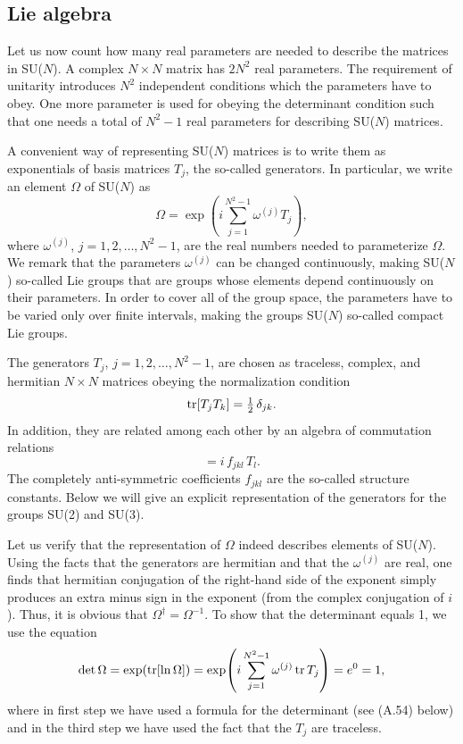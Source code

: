 \subsection{Lie algebra}

Let us now count how many real parameters are needed to describe the matrices
in SU($N$). A complex $N\times N$ matrix has $2N^2$ real parameters. The
requirement of unitarity introduces $N^2$ independent conditions which the
parameters have to obey. One more parameter is used for obeying the determinant
condition such that one needs a total of $N^2-1$ real parameters for describing
SU($N$) matrices.

A convenient way of representing SU($N$) matrices is to write them as
exponentials of basis matrices $T_j$, the so-called generators. In particular,
we write an element $\Omega$ of SU($N$) as
\begin{equation}
  \Omega = \exp\!\left(i\sum_{j=1}^{N^2-1}\omega^{(j)} T_j\right),
\end{equation}
where $\omega^{(j)}$, $j = 1, 2, \ldots, N^2-1$, are the real numbers needed to
parameterize $\Omega$. We remark that the parameters $\omega^{(j)}$ can be
changed continuously, making SU($N$) so-called Lie groups that are groups whose
elements depend continuously on their parameters. In order to cover all of the
group space, the parameters have to be varied only over finite intervals,
making the groups SU($N$) so-called compact Lie groups.

The generators $T_j$, $j = 1, 2, \ldots, N^2-1$, are chosen as traceless,
complex, and hermitian $N\times N$ matrices obeying the normalization condition
\begin{equation}
  \operatorname{tr}[T_j T_k] = \tfrac{1}{2}\,\delta_{jk}.
\end{equation}
In addition, they are related among each other by an algebra of commutation
relations
\begin{equation}
  [T_j, T_k] = i\, f_{jkl}\, T_l .
\end{equation}
The completely anti-symmetric coefficients $f_{jkl}$ are the so-called
structure constants. Below we will give an explicit representation of the
generators for the groups SU(2) and SU(3).

Let us verify that the representation of $\Omega$ indeed describes elements of
SU($N$). Using the facts that the generators are hermitian and that the
$\omega^{(j)}$ are real, one finds that hermitian conjugation of the right-hand
side of the exponent simply produces an extra minus sign in the exponent (from
the complex conjugation of $i$). Thus, it is obvious that $\Omega^\dagger =
\Omega^{-1}$. To show that the determinant equals 1, we use the equation
\begin{equation}
  \det\Omega = \exp(\operatorname{tr}[\ln\Omega])
  = \exp\!\left(i\sum_{j=1}^{N^2-1}\omega^{(j)}\operatorname{tr} T_j\right) = e^0 = 1,
\end{equation}
where in first step we have used a formula for the determinant (see (A.54)
below) and in the third step we have used the fact that the $T_j$ are
traceless.

